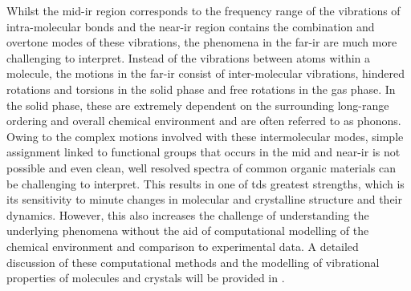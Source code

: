 Whilst the mid\nobreakdash-\acrshort{ir} region corresponds to the frequency range of the vibrations of intra\nobreakdash-molecular bonds and the near\nobreakdash-\acrshort{ir} region contains the combination and overtone modes of these vibrations, the phenomena in the far\nobreakdash-\acrshort{ir} are much more challenging to interpret. 
Instead of the vibrations between atoms within a molecule, the motions in the far\nobreakdash-\acrshort{ir} consist of inter\nobreakdash-molecular vibrations, hindered rotations and torsions in the solid phase and free rotations in the gas phase. In the solid phase, these are extremely dependent on the surrounding long\nobreakdash-range ordering and overall chemical environment and are often referred to as phonons. Owing to the complex motions involved with these intermolecular modes, simple assignment linked to functional groups that occurs in the mid and near\nobreakdash-\acrshort{ir} is not possible and even clean, well resolved spectra of common organic materials can be challenging to interpret. This results in one of \acrshort{tds} greatest strengths, which is its sensitivity to minute changes in molecular and crystalline structure and their dynamics. However, this also increases the challenge of understanding the underlying phenomena without the aid of computational modelling of the chemical environment and comparison to experimental data. A detailed discussion of these computational methods and the modelling of vibrational properties of molecules and crystals will be provided in .


